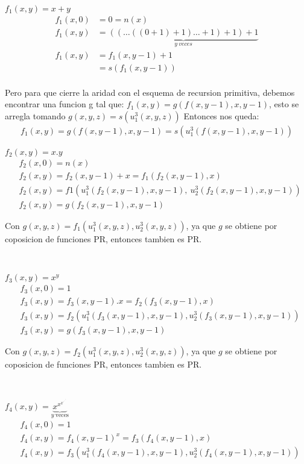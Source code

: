 \documentclass{report}
\begin{document}
\sol $f_1(x,y) = x+y$
\begin{align*}
	f_1(x,0) &= 0 = n(x)\\
	f_1(x,y) &= \underbrace{((\ldots((0+1)+1)\ldots+1)+1)+1}_{y \ veces}\\
	f_1(x,y) &= f_1(x,y-1)+1\\
			 &= s(f_1(x,y-1))\\
\end{align*}

Pero para que cierre la aridad con el esquema de recursion primitiva, debemos encontrar una funcion g tal que:
$f_1(x,y) = g(f(x,y-1),x,y-1)$, esto se arregla tomando $g(x,y,z) = s(u_1^3(x,y,z))$
Entonces nos queda:
\begin{align}
	f_1(x,y) = g(f(x,y-1),x,y-1) = s(u_1^3(f(x,y-1),x,y-1))
\end{align}

\sol $f_{2}(x,y)=x.y$
\begin{align*}
	&f_{2}(x,0)=n(x) \\
	&f_2(x,y)=f_2(x,y-1)+x=f_1(f_2(x,y-1),x)\\
	&f_{2}(x,y)= f1(u_1^3(f_2(x,y-1),x,y-1),\ u_2^3(f_2(x,y-1),x,y-1))\\
	&f_{2}(x,y)= g(f_2(x,y-1),x,y-1)
\end{align*}

Con $g(x,y,z) = f_1(u_1^3(x,y,z),u_2^3(x,y,z))$, ya que $g$ se obtiene por coposicion de funciones PR, entonces tambien es PR.

~

\sol $f_{3}(x,y)=x^{y}$
\begin{align*}
	&f_{3}(x,0)=1\\
	&f_{3}(x,y)=f_{3}(x,y-1).x=f_{2}(f_{3}(x,y-1),x)\\
	&f_{3}(x,y)=f_{2}(u_{1}^{3}(f_{3}(x,y-1),x,y-1),u_{2}^{3}(f_{3}(x,y-1),x,y-1))\\
	&f_{3}(x,y)= g(f_3(x,y-1),x,y-1)
\end{align*}

Con $g(x,y,z) = f_2(u_1^3(x,y,z),u_2^3(x,y,z))$, ya que $g$ se obtiene por coposicion de funciones PR, entonces tambien es PR.

~

\sol 
$f_4(x,y)=\underbrace{x^{x^{x^{\cdot^{\cdot^{\cdot^{\cdot^{x}}}}}}}}_{y\ \text{veces}}$
\begin{align*}
	&f_{4}(x,0)=1\\
	&f_{4}(x,y)=f_{4}(x,y-1)^{x}=f_{3}(f_{4}(x,y-1),x)\\
	&f_{4}(x,y)=f_{3}(u_{1}^{3}(f_{4}(x,y-1),x,y-1),u_{2}^{3}(f_{4}(x,y-1),x,y-1))
\end{align*}
\end{document}
